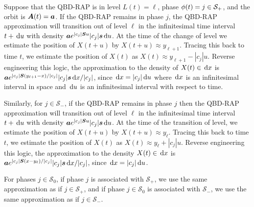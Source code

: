 Suppose that the QBD-RAP is in level \(L(t)=\ell\), phase \(\phi(t)=j\in\mathcal{S}_+\), and the orbit is \(\boldsymbol A(t)=\boldsymbol a\). If the QBD-RAP remains in phase \(j\), the QBD-RAP approximation will transition out of level \(\ell\) in the infinitesimal time interval \(t+\, \mathrm{d} u\) with density \(\boldsymbol a e^{|c_j|\boldsymbol{S}u}|c_j|\boldsymbol s\, \mathrm{d} u\). At the time of the change of level we estimate the position of \(X(t+u)\) by \(X(t+u)\approx y_{\ell+1}\). Tracing this back to time \(t\), we estimate the position of \(X(t)\) as \(X(t)\approx y_{\ell+1} - |c_j|u\). Reverse engineering this logic, the approximation to the density of \(X(t) \in\, \mathrm{d} x\) is \(\boldsymbol a e^{|c_j|\boldsymbol S(y_{\ell+1}-x)/|c_j|}|c_j|\boldsymbol s \, \mathrm{d} x/|c_j|\), since \(\, \mathrm{d} x = |c_j|\, \mathrm{d} u\) where \(\, \mathrm{d} x\) is an infinitesimal interval in space and \(\, \mathrm{d} u\) is an infinitesimal interval with respect to time.

Similarly, for \(j\in\mathcal S_-\), if the QBD-RAP remains in phase \(j\) then the QBD-RAP approximation will transition out of level \(\ell\) in the infinitesimal time interval \(t+\, \mathrm{d} u\) with density \(\boldsymbol a e^{|c_j|\boldsymbol{S}u}|c_j|\boldsymbol s\, \mathrm{d} u\). At the time of the transition of level, we estimate the position of \(X(t+u)\) by \(X(t+u)\approx y_{\ell}\). Tracing this back to time \(t\), we estimate the position of \(X(t)\) as \(X(t)\approx y_{\ell} + |c_j|u\). Reverse engineering this logic, the approximation to the density \(X(t) \in\, \mathrm{d} x\) is \(\boldsymbol a e^{|c_j|\boldsymbol S(x-y_{\ell})/|c_j|}|c_j|\boldsymbol s \, \mathrm{d} x/|c_j|\), since \(\, \mathrm{d} x = |c_j|\, \mathrm{d} u\). 

For phases \(j\in\mathcal S_0\), if phase \(j\) is associated with \(\mathcal S_+\), we use the same approximation as if \(j\in \mathcal S_+\), and if phase \(j\in\mathcal S_0\) is associated with \(\mathcal S_-\), we use the same approximation as if \(j\in \mathcal S_-\).

